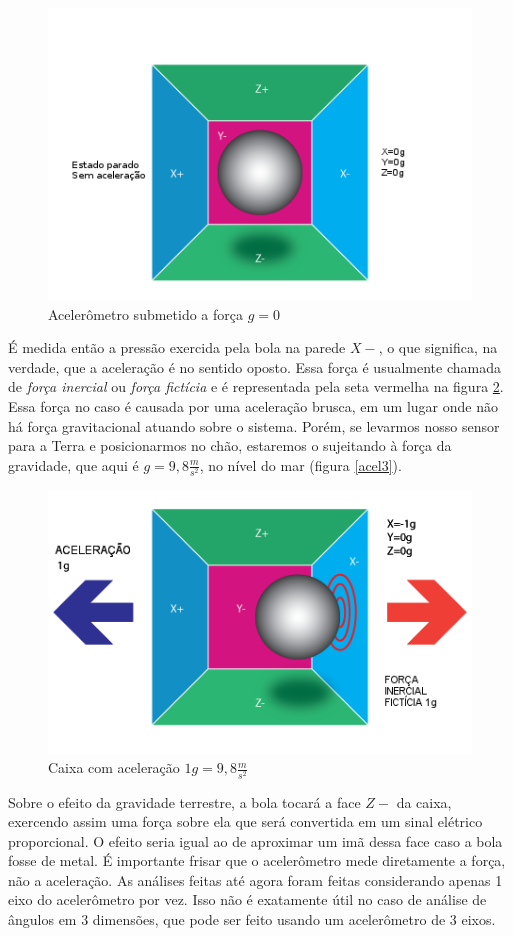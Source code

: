 \documentclass[a4paper,12pt]{article}
\begin{document}
\begin{figure}[H]
\centering
\includegraphics[width=.6\textwidth]{img/acel1.png}
\caption{Acelerômetro submetido a força $g=0$}
\label{acel1}
\end{figure}

É medida então a pressão exercida pela bola na parede $X-$, o que significa, na verdade, que a aceleração é no sentido oposto. Essa força é usualmente chamada de \emph{força inercial} ou \emph{força fictícia} e é representada pela seta vermelha na figura \ref{acel2}. Essa força no caso é causada por uma aceleração brusca, em um lugar onde não há força gravitacional atuando sobre o sistema. Porém, se levarmos nosso sensor para a Terra e posicionarmos no chão, estaremos o sujeitando à força da gravidade, que aqui é $g=9,8 \frac{m}{s^2}$, no nível do mar (figura \ref{acel3}).

\begin{figure}[H]
\centering
\includegraphics[width=.6\textwidth]{img/acel2.png}
\caption{Caixa com aceleração $1g=9,8 \frac{m}{s^2}$}
\label{acel2}
\end{figure}

Sobre o efeito da gravidade terrestre, a bola tocará a face $Z-$ da caixa, exercendo assim uma força sobre ela que será convertida em um sinal elétrico proporcional. O efeito seria igual ao de aproximar um imã dessa face caso a bola fosse de metal. É importante frisar que o acelerômetro mede diretamente a força, não a aceleração. As análises feitas até agora foram feitas considerando apenas 1 eixo do acelerômetro por vez. Isso não é exatamente útil no caso de análise de ângulos em 3 dimensões, que pode ser feito usando um acelerômetro de 3 eixos.
\end{document}
